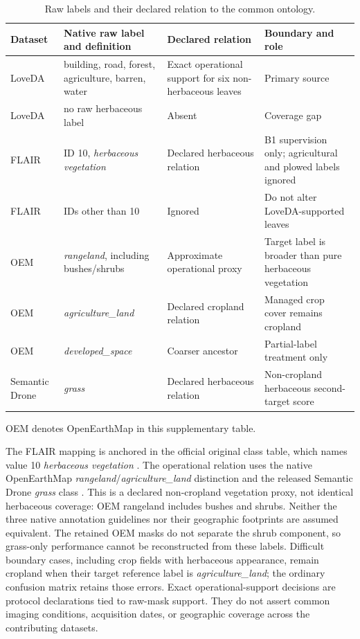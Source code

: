 \begin{table}[H]
\centering
\caption{Raw labels and their declared relation to the common ontology.}
{\small
\setlength{\tabcolsep}{3pt}
\begin{tabular}{>{\raggedright\arraybackslash}p{}>{\raggedright\arraybackslash}p{}>{\raggedright\arraybackslash}p{}>{\raggedright\arraybackslash}p{}}
\toprule
Dataset & Native raw label and definition & Declared relation & Boundary and role \\
\midrule
LoveDA & building, road, forest, agriculture, barren, water & Exact operational support for six non-herbaceous leaves & Primary source \\
LoveDA & no raw herbaceous label & Absent & Coverage gap \\
FLAIR & ID 10, \emph{herbaceous vegetation} \citep{ign2026flair1} & Declared herbaceous relation & B1 supervision only; agricultural and plowed labels ignored \\
FLAIR & IDs other than 10 & Ignored & Do not alter LoveDA-supported leaves \\
OEM & \emph{rangeland}, including bushes/shrubs \citep{xia2023openearthmap} & Approximate operational proxy & Target label is broader than pure herbaceous vegetation \\
OEM & \emph{agriculture\_land} \citep{xia2023openearthmap} & Declared cropland relation & Managed crop cover remains cropland \\
OEM & \emph{developed\_space} & Coarser ancestor & Partial-label treatment only \\
Semantic Drone & \emph{grass} \citep{tugraz2018semanticdrone} & Declared herbaceous relation & Non-cropland herbaceous second-target score \\
\bottomrule
\end{tabular}
}
\end{table}

OEM denotes OpenEarthMap in this supplementary table.

The FLAIR mapping is anchored in the official original class table, which names value 10 \emph{herbaceous vegetation} \citep{ign2026flair1}. The operational relation uses the native OpenEarthMap \emph{rangeland}/\emph{agriculture\_land} distinction \citep{xia2023openearthmap} and the released Semantic Drone \emph{grass} class \citep{tugraz2018semanticdrone}. This is a declared non-cropland vegetation proxy, not identical herbaceous coverage: OEM rangeland includes bushes and shrubs. Neither the three native annotation guidelines nor their geographic footprints are assumed equivalent. The retained OEM masks do not separate the shrub component, so grass-only performance cannot be reconstructed from these labels. Difficult boundary cases, including crop fields with herbaceous appearance, remain cropland when their target reference label is \emph{agriculture\_land}; the ordinary confusion matrix retains those errors. Exact operational-support decisions are protocol declarations tied to raw-mask support. They do not assert common imaging conditions, acquisition dates, or geographic coverage across the contributing datasets.

